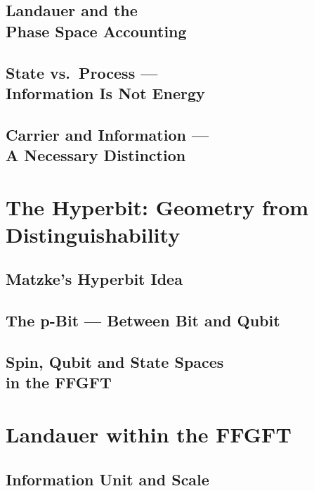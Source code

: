 \documentclass[11pt,twoside,openright]{book}
\theoremstyle{plain}
\theoremstyle{definition}
\begin{document}
\chapter[Landauer and the Phase Space Accounting]{Landauer and the\\
Phase Space Accounting}


\chapter[State vs.\ Process]{State vs.\ Process ---\\
Information Is Not Energy}


\chapter[Carrier and Information]{Carrier and Information ---\\
A Necessary Distinction}


\part{The Hyperbit: Geometry from Distinguishability}

\chapter{Matzke's Hyperbit Idea}


\chapter{The p-Bit --- Between Bit and Qubit}


\chapter[Spin, Qubit and State Spaces]{Spin, Qubit and State Spaces\\
in the FFGFT}


\part{Landauer within the FFGFT}

\chapter{Information Unit and Scale}

\end{document}
